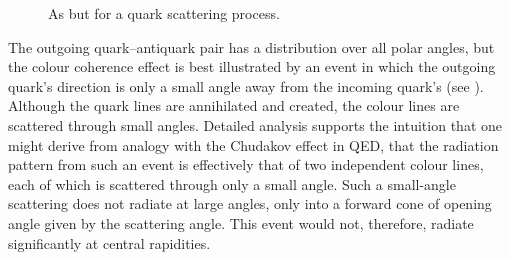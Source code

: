 \begin{figure}[t]
  \centerline{\!\!%
    \hfill{}\!\!
    \hfill{}\!\!
    }
  \caption{As  but for a quark
    scattering process.}
  \label{fig:hardscattercoherence2}
\end{figure}
The outgoing quark--antiquark pair has a distribution over all polar
angles, but the colour coherence effect is best illustrated by an event
in which the outgoing quark's direction is only a small angle away from
the incoming quark's (see ).  Although
the quark lines are annihilated and created, the colour lines are
scattered through small angles.  Detailed analysis supports the
intuition that one might derive from analogy with the Chudakov effect in
QED, that the radiation pattern from such an event is effectively that
of two independent colour lines, each of which is scattered through only
a small angle.  Such a small-angle scattering does not radiate at large
angles, only into a forward cone of opening angle given by the
scattering angle.  This event would not, therefore, radiate significantly at
central rapidities.

